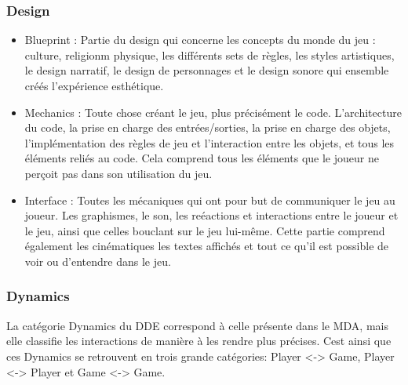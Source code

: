 \subsubsection{Design}
    \begin{itemize}
        \item Blueprint : Partie du design qui concerne les concepts du monde du jeu : culture, religionm physique, les différents sets de règles, les styles artistiques, le design narratif, le design de personnages et le design sonore qui ensemble créés l'expérience esthétique.
        \item Mechanics : Toute chose créant le jeu, plus précisément le code. L'architecture du code, la prise en charge des entrées/sorties, la prise en charge des objets, l'implémentation des règles de jeu et l'interaction entre les objets, et tous les éléments reliés au code. Cela comprend tous les éléments que le joueur ne perçoit pas dans son utilisation du jeu.
        \item Interface : Toutes les mécaniques qui ont pour but de communiquer le jeu au joueur. Les graphismes, le son, les reéactions et interactions entre le joueur et le jeu, ainsi que celles bouclant sur le jeu lui-même. Cette partie comprend également les cinématiques les textes affichés et tout ce qu'il est possible de voir ou d'entendre dans le jeu.
    \end{itemize}

\subsubsection{Dynamics}
    La catégorie Dynamics du DDE correspond à celle présente dans le MDA, mais elle classifie les interactions de manière à les rendre plus précises. Cest ainsi que ces Dynamics se retrouvent en trois grande catégories: Player <-> Game, Player <-> Player et Game <-> Game.


